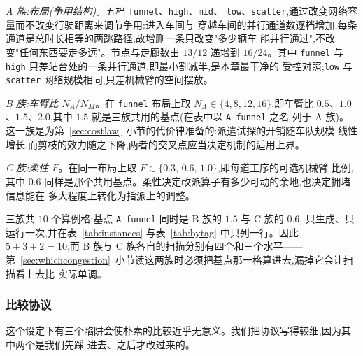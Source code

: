 \documentclass[manuscript,screen,review]{acmart}
\newcommand{\NCases}{10}
\begin{document}
\emph{A 族:布局(争用结构)}。五档 \texttt{funnel}、\texttt{high}、\texttt{mid}、
\texttt{low}、\texttt{scatter},通过改变网络容量而不改变行驶距离来调节争用:进入车间与
穿越车间的并行通道数逐档增加,每条通道是总时长相等的两跳路径,故增删一条只改变"多少辆车
能并行通过",不改变"任何东西要走多远"。节点与走廊数由 $13/12$ 递增到 $16/24$。其中
\texttt{funnel} 与 \texttt{high} 只差站台处的一条并行通道,即最小割减半,是本章最干净的
受控对照;\texttt{low} 与 \texttt{scatter} 网络规模相同,只差机械臂的空间摆放。

\emph{B 族:车臂比 $N_A/N_M$}。在 \texttt{funnel} 布局上取 $N_A\in\{4,8,12,16\}$,即车臂比
$0.5$、$1.0$、$1.5$、$2.0$,其中 $1.5$ 就是三族共用的基点(在表中以 \texttt{A funnel} 之名
列于 A 族)。这一族是为第~\ref{sec:costlaw}~小节的代价律准备的:派遣试探的开销随车队规模
线性增长,而剪枝的效力随之下降,两者的交叉点应当决定机制的适用上界。

\emph{C 族:柔性 $F$}。在同一布局上取 $F\in\{0.3,\,0.6,\,1.0\}$,即每道工序的可选机械臂
比例,其中 $0.6$ 同样是那个共用基点。柔性决定改派算子有多少可动的余地,也决定拥堵信息能在
多大程度上转化为指派上的调整。

三族共 $\NCases$ 个算例格:基点 \texttt{A funnel} 同时是 B 族的 $1.5$ 与 C 族的 $0.6$,
只生成、只运行一次,并在表~\ref{tab:instances} 与表~\ref{tab:bytag} 中只列一行。因此
$5+3+2=\NCases$,而 B 族与 C 族各自的扫描分别有四个和三个水平——
第~\ref{sec:whichcongestion}~小节读这两族时必须把基点那一格算进去,漏掉它会让扫描看上去比
实际单调。

\begin{table}[t]
\caption{受控算例族。全部算例格共用 $12$ 工件、$36$ 道真实工序、$8$ 台机械臂、$H=0.3$、
$\bar{T}_t/\bar{T}_p\approx4.0$;三族分别只变化布局、车臂比与柔性。争用强度为初始随机种群
下让行时间占行驶总时间的比例,由算例自身结构决定而非人为设定。}
\label{tab:instances}
\small

\end{table}

\subsubsection{比较协议}
\label{sec:protocol}

这个设定下有三个陷阱会使朴素的比较近乎无意义。我们把协议写得较细,因为其中两个是我们先踩
进去、之后才改过来的。
\end{document}
